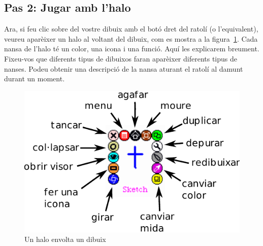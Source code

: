 \subsection{Pas 2: Jugar amb l'halo}
Ara, si feu clic sobre del vostre dibuix amb el botó dret del ratolí (o l'equivalent), veureu aparèixer un halo al voltant del dibuix, com es mostra a la figura~\ref{fig2403}. Cada nansa de l'halo té un color, una icona i una funció. Aquí les explicarem breument. Fixeu-vos que diferents tipus de dibuixos faran aparèixer diferents tipus de nanses. Podeu obtenir una descripció de la nansa aturant el ratolí al damunt durant un moment. 
\begin{figure}[h!]
\begin{center}
\includegraphics[scale=1]{Imatges/figura24-3}
\end{center}
\caption{Un halo envolta un dibuix}
\label{fig2403}
\end{figure}


